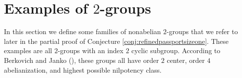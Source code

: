 \documentclass{dcthesis}
\newcommand{\defi}[1]{\textsf{#1}}
\numberwithin{equation}{section}
\theoremstyle{definition}
\theoremstyle{remark}
\newtheorem{example}[equation]{Example}
\begin{document}
{{  \section{Examples of $2$-groups}{\label{sec:twogroupexamples}
    In this section we define
    some families of
    nonabelian $2$-groups
    that we refer to later in
    the partial proof of
    Conjecture \ref{conj:refinedpassportsizeone}.
    These examples are all $2$-groups
    with an index $2$ cyclic subgroup.
    According to
    Berkovich and Janko
    (\cite[Theorem 1.2]{berkovich1}),
    these groups all have order $2$ center,
    order $4$ abelianization,
    and highest possible nilpotency class.
}}}
\end{document}
